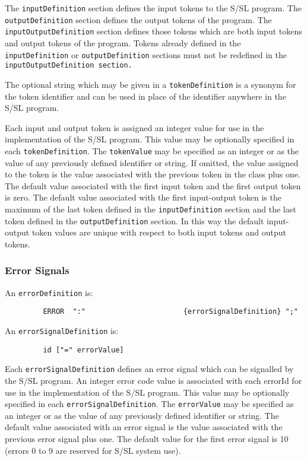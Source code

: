 The {\tt inputDefinition} section defines the input  tokens  to
the  S/SL program.  The {\tt outputDefinition} section defines the
output tokens of  the  program.   The  {\tt inputOutputDefinition}
section defines those tokens which are both input tokens and
output tokens of the program.  Tokens already defined in the
{\tt inputDefinition} or  {\tt outputDefinition} sections
must not be
redefined in the {\tt inputOutputDefinition section.}

The optional string which may be given in a {\tt tokenDefinition}
is  a synonym for the token identifier and can be used
in place of the identifier anywhere in the S/SL program.

Each input and output token is assigned an integer  value
for  use  in  the  implementation of the S/SL program.  This
value may be optionally specified in  each  {\tt tokenDefinition}.
The {\tt tokenValue} may  be  specified  as an integer or as the
value of any previously defined identifier  or  string.   If
omitted,  the value assigned to the token is the value associated with 
the previous token in the class plus one. The
default  value associated with the first input token and the
first output token is zero.  The  default  value  associated
with the first input-output token is the maximum of the last
token defined in the {\tt inputDefinition} section  and  the    last
token  defined in the {\tt outputDefinition} section.    In this way
the  default  input-output  token  values  are  unique  with
respect to both input tokens and output tokens.




\subsubsection{Error Signals}

An {\tt errorDefinition} is:
\begin{tscreen}
\begin{verbatim}
         ERROR  ":"                       {errorSignalDefinition} ";"
\end{verbatim}
\end{tscreen}


An {\tt errorSignalDefinition} is:
\begin{tscreen}
\begin{verbatim}
         id ["=" errorValue]
\end{verbatim}
\end{tscreen}


Each {\tt errorSignalDefinition} defines an error signal  which
can be signalled by the S/SL program.  An integer error code
value is associated with each errorId for use in the  
implementation of the S/SL program.     This value may be optionally
specified in each {\tt errorSignalDefinition}.  The {\tt errorValue} may
be specified as an integer or as the value of any previously
defined identifier or string.  The default value  associated
with an error signal is the value associated with the 
previous error signal plus one.  The default value for the  first
error signal is 10 (errors 0 to 9 are reserved for S/SL system use).




